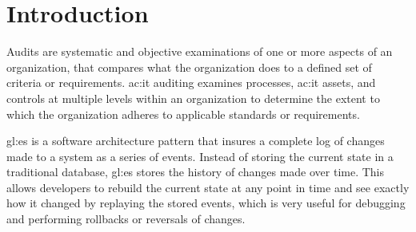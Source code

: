 %
\chapter{Introduction}





Audits are systematic and objective examinations of one or more aspects of an organization, that compares what the organization does to a defined set of criteria or requirements. \gls{ac:it} auditing examines processes, \gls{ac:it} assets, and controls at multiple levels within an organization to determine the extent to which the organization adheres to applicable standards or requirements. 

\gls{gl:es} is a software architecture pattern that insures a complete log of changes made to a system as a series of events. Instead of storing the current state in a traditional database, \gls{gl:es} stores the history of changes made over time. This allows developers to rebuild the current state at any point in time and see exactly how it changed by replaying the stored events, which is very useful for debugging and performing rollbacks or reversals of changes.

